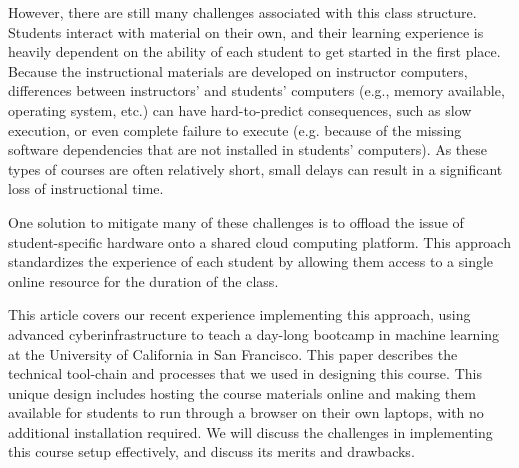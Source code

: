 However, there are still many challenges associated with this class structure.
Students interact with material on their own, and their learning experience is
heavily dependent on the ability of each student to get started in the first
place. Because the instructional materials are developed on instructor
computers, differences between instructors' and students' computers (e.g., memory
available, operating system, etc.) can have hard-to-predict consequences, such
as slow execution, or even complete failure to execute (e.g. because of the
missing software dependencies that are not installed in students' computers).
As these types of courses are often relatively short, small delays can result
in a significant loss of instructional time.

One solution to mitigate many of these challenges is to offload the issue of
student-specific hardware onto a shared cloud computing platform. This approach
standardizes the experience of each student by allowing them access to a single
online resource for the duration of the class.

This article covers our recent experience implementing this approach, using
advanced cyberinfrastructure to teach a day-long bootcamp in machine learning at
the University of California in San Francisco. This paper describes the
technical tool-chain and processes that we used in designing this course. This
unique design includes hosting the course materials online and
making them available for students to run through a browser on their own laptops,
with no additional installation required. We will discuss the challenges in
implementing this course setup effectively, and discuss its merits and
drawbacks.
